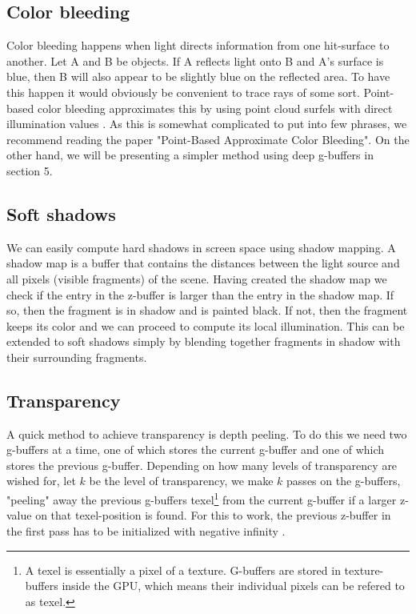 \documentclass{ACGSeminar}
\begin{document}
	\subsection{Color bleeding}
		Color bleeding happens when light directs information from one hit-surface to another. Let A and B be objects. If A reflects light onto B and A's surface is blue, then B will also appear
		to be slightly blue on the reflected area. To have this happen it would obviously be convenient to trace rays of some sort. Point-based color bleeding approximates this by using point cloud surfels with direct illumination values \cite{PBCB}. As this is somewhat complicated to put into few phrases, we recommend reading the paper "Point-Based Approximate Color Bleeding". On the other hand, we will be presenting a simpler method using deep g-buffers in section 5.

	\subsection{Soft shadows}
		We can easily compute hard shadows in screen space using shadow mapping. A shadow map is a buffer that contains the distances between the light source and all pixels (visible fragments) of the scene. Having created the shadow map we check if the entry in the z-buffer is larger than the entry in the shadow map. If so, then the fragment is in shadow and is painted black. If not, then the fragment keeps its color and we can proceed to compute its local illumination. This can be extended to soft shadows simply by blending together fragments in shadow with their surrounding fragments.

	\subsection{Transparency}
		A quick method to achieve transparency is depth peeling. To do this we need two g-buffers at a time, one of which stores the current g-buffer and one of which stores the previous g-buffer. Depending on how many levels of transparency are wished for, let $k$ be the level of transparency, we make $k$ passes on the g-buffers, "peeling" away the previous g-buffers texel\footnote{A texel is essentially a pixel of a texture. G-buffers are stored in texture-buffers inside the GPU, which means their individual pixels can be refered to as texel.} from the current g-buffer if a larger z-value on that texel-position is found. For this to work, the previous z-buffer in the first pass has to be initialized with negative infinity \cite{NOIT}.
\end{document}
